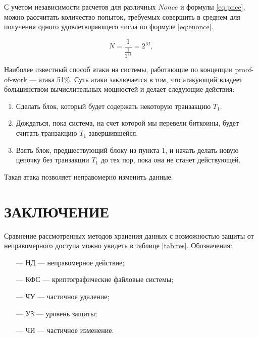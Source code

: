 С учетом независимости расчетов для различных $Nonce$ и формулы \ref{eq:pnce}, можно рассчитать количество попыток, требуемых совершить в среднем для получения одного удовлетворяющего числа по формуле \ref{eq:enonce}.

\begin{equation}
    \label{eq:enonce}
    N = \frac{1}{\frac{1}{2^M}} = 2^M,
\end{equation}

Наиболее известный способ атаки на системы, работающие по концепции proof-of-work --- атака 51\%. Суть атаки заключается в том, что атакующий владеет большинством вычислительных мощностей и делает следующие действия:
\begin{enumerate}
    \item Сделать блок, который будет содержать некоторую транзакцию $T_1$.
    \item Дождаться, пока система, на счет которой мы перевели биткоины, будет считать транзакцию $T_1$ завершившейся.
    \item Взять блок, предшествующий блоку из пункта 1, и начать делать новую цепочку без транзакции $T_1$ до тех пор, пока она не станет действующей.
\end{enumerate}

Такая атака позволяет неправомерно изменить данные.

\pagebreak

\section*{ЗАКЛЮЧЕНИЕ}

Сравнение рассмотренных методов хранения данных с возможностью защиты от неправомерного доступа можно увидеть в таблице \ref{tab:res}. Обозначения:
\begin{itemize}
    \item[---] НД --- неправомерное действие;
    \item[---] КФС --- криптографические файловые системы;
    \item[---] ЧУ --- частичное удаление;
    \item[---] УЗ --- уровень защиты;
    \item[---] ЧИ --- частичное изменение.
\end{itemize}


